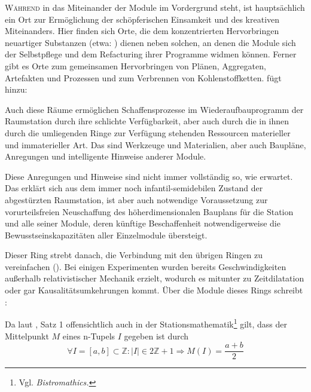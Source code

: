 \begin{newstuff}
   \lettrine{W}{ährend} in  das Miteinander der Module im Vordergrund steht, ist  hauptsächlich ein Ort zur Ermöglichung der schöpferischen Einsamkeit und des kreativen Miteinanders. Hier finden sich Orte, die dem konzentrierten Hervorbringen neuartiger Substanzen (etwa: ) dienen neben solchen, an denen die Module sich der Selbstpflege und dem Refacturing ihrer Programme widmen können. Ferner gibt es Orte zum gemeinsamen Hervorbringen von Plänen, Aggregaten, Artefakten und Prozessen und zum Verbrennen von Kohlenstoffketten. \cite[S. 110]{cbasebook} fügt hinzu:


    Auch diese Räume ermöglichen Schaffensprozesse im Wiederaufbauprogramm der Raumstation durch ihre schlichte Verfügbarkeit, aber auch durch die in ihnen durch die umliegenden Ringe zur Verfügung stehenden Ressourcen materieller und immaterieller Art. Das sind Werkzeuge und Materialien, aber auch Baupläne, Anregungen und intelligente Hinweise anderer Module. 

    Diese Anregungen und Hinweise sind nicht immer vollständig so, wie erwartet. Das erklärt sich aus dem immer noch infantil-semidebilen Zustand der abgestürzten Raumstation, ist aber auch notwendige Voraussetzung zur vorurteilsfreien Neuschaffung des höherdimensionalen Bauplans für die Station und alle seiner Module, deren künftige Beschaffenheit notwendigerweise die Bewusstseinskapazitäten aller Einzelmodule übersteigt.

    Dieser Ring strebt danach, die Verbindung mit den übrigen Ringen zu vereinfachen (). Bei einigen Experimenten wurden bereits Geschwindigkeiten außerhalb relativistischer Mechanik erzielt, wodurch es mitunter zu Zeitdilatation oder gar Kausalitätsumkehrungen kommt. Über die Module dieses Rings schreibt \cite[S. 117]{cbasebook}:

    Da laut \cite{ctour}, Satz 1 offensichtlich auch in der Stationsmathematik\footnote{
    Vgl. \cite[Kap. 5]{adams_life} \emph{Bistromathics.}
    }   gilt, dass der Mittelpunkt $M$ eines n-Tupels $I$ gegeben ist durch
    \begin{equation}
        \forall I = [a,b] \subset \mathbb{Z}: |I| \in 2\mathbb{Z}+1 \Rightarrow M(I) = \frac{a+b}{2}
    \end{equation}


\end{newstuff}
